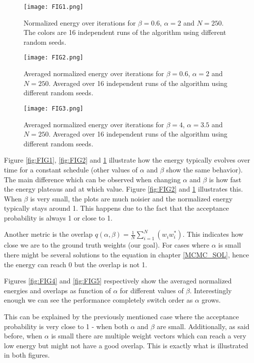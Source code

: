 \documentclass[a4paper]{article}
\begin{document}
\begin{figure}[!htb]
 \centering
{}
\centering
\texttt{[image: FIG1.png]}
\caption{\label{fig:FIG1}Normalized energy over iterations for $\beta = 0.6$, $\alpha = 2$ and $N = 250$. The colors are 16 independent runs of the algorithm using different random seeds.}
\endminipage\par\medskip
{}
\texttt{[image: FIG2.png]}
\caption{\label{fig:FIG2}Averaged normalized energy over iterations for $\beta = 0.6$, $\alpha = 2$ and $N = 250$. Averaged over 16 independent runs of the algorithm using different random seeds.}
\endminipage\hfill
{}%
\texttt{[image: FIG3.png]}
\caption{\label{fig:FIG3}Averaged normalized energy over iterations for $\beta = 4$, $\alpha = 3.5$ and $N = 250$. Averaged over 16 independent runs of the algorithm using different random seeds.}
\endminipage
\end{figure}


Figure \ref{fig:FIG1}, \ref{fig:FIG2} and \ref{fig:FIG3} illustrate how the energy typically evolves over time for a constant schedule (other values of $\alpha$ and $\beta$ show the same behavior). The main difference which can be observed when changing $\alpha$ and $\beta$ is how fast the energy plateaus and at which value. Figure \ref{fig:FIG2} and \ref{fig:FIG3} illustrates this. When $\beta$ is very small, the plots are much noisier and the normalized energy typically stays around 1. This happens due to the fact that the acceptance probability is always 1 or close to 1.

Another metric is the overlap $q(\alpha, \beta) = \frac{1}{N} \sum_{i = 1}^{N}(w_i w_{i}^{*})$. This indicates how close we are to the ground truth weights (our goal). For cases where $\alpha$ is small there might be several solutions to the equation in chapter \ref{MCMC_SOL}, hence the energy can reach 0 but the overlap is not 1.

Figures \ref{fig:FIG4} and \ref{fig:FIG5} respectively show the averaged normalized energies and overlaps as function of $\alpha$ for different values of $\beta$. Interestingly enough we can see the performance completely switch order as $\alpha$ grows.

This can be explained by the previously mentioned case where the acceptance probability is very close to 1 - when both $\alpha$ and $\beta$ are small. Additionally, as said before, when $\alpha$ is small there are multiple weight vectors which can reach a very low energy but might not have a good overlap. This is exactly what is illustrated in both figures.
\end{document}
